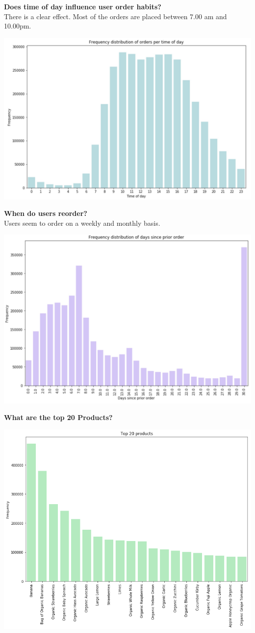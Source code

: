 \documentclass[12pt]{article}
\begin{document}
\noindent
\textbf{Does time of day influence user order habits?} \\
There is a clear effect. Most of the orders are placed between 7.00 am and 10.00pm.
\begin{center}
	\includegraphics[scale=0.2]{order_tod}
\end{center}

\newpage
\noindent
\textbf{When do users reorder?} \\
Users seem to order on a weekly and monthly basis.
\begin{center}
	\includegraphics[scale=0.2]{days_since_prior_order}
\end{center}


\noindent
\textbf{What are the top 20 Products?} \\
\begin{center}
	\includegraphics[scale=0.4]{top_20_products.png}
\end{center}
\end{document}
